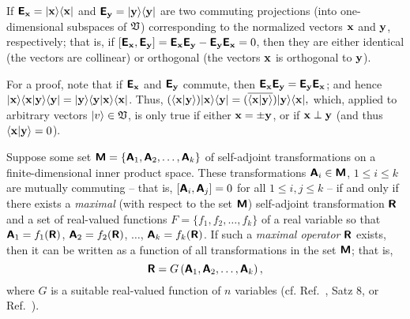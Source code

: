 If
$\textsf{\textbf{E}}_{\bf x} = \vert {\bf x} \rangle \langle {\bf x} \vert$
and
$\textsf{\textbf{E}}_{\bf y} = \vert {\bf y} \rangle \langle {\bf y} \vert$
are two commuting projections (into one-dimensional subspaces of ${\frak V}$)
corresponding to the normalized vectors ${\bf x}$  and ${\bf y}$,
respectively; that is, if
$\left[
\textsf{\textbf{E}}_{\bf x}
,
\textsf{\textbf{E}}_{\bf y}
\right]=
\textsf{\textbf{E}}_{\bf x}
\textsf{\textbf{E}}_{\bf y}
-
\textsf{\textbf{E}}_{\bf y}
\textsf{\textbf{E}}_{\bf x}
=0$,
then they are either identical (the vectors are collinear) or orthogonal (the vectors ${\bf x}$ is orthogonal to ${\bf y}$).


{%
For a proof,
note that if $\textsf{\textbf{E}}_{\bf x}$ and $\textsf{\textbf{E}}_{\bf y}$ commute, then
$\textsf{\textbf{E}}_{\bf x}\textsf{\textbf{E}}_{\bf y} =  \textsf{\textbf{E}}_{\bf y}    \textsf{\textbf{E}}_{\bf x}$; and
hence $
\vert {\bf x} \rangle \langle {\bf x} \vert {\bf y} \rangle \langle {\bf y} \vert
=
\vert {\bf y} \rangle \langle {\bf y} \vert {\bf x} \rangle \langle {\bf x} \vert $. Thus,
$
(
\langle {\bf x} \vert {\bf y} \rangle )\vert {\bf x} \rangle  \langle {\bf y}  \vert
=
(\overline{\langle {\bf x} \vert {\bf y} \rangle})
\vert {\bf y} \rangle  \langle {\bf x} \vert  ,
$
which, applied to arbitrary vectors $ \vert   v\rangle \in {\frak V}$, is only true if either ${\bf x} = \pm {\bf y}$,
or if ${\bf x} \perp {\bf y}$ (and thus $\langle {\bf x} \vert {\bf y} \rangle =0$).
}



Suppose some set $\textsf{\textbf{M}}
=
\{
\textsf{\textbf{A}}_1,
\textsf{\textbf{A}}_2,
\ldots ,
\textsf{\textbf{A}}_k
\}
$
of  self-adjoint transformations on a finite-dimensional inner product space.
These  transformations  $\textsf{\textbf{A}}_i \in \textsf{\textbf{M}}$, $1\le i \le k$
are mutually commuting -- that is, $[\textsf{\textbf{A}}_i,\textsf{\textbf{A}}_j] =0$ for all $1\le i,j \le k$ -- if and only if there exists
a {\em maximal} (with respect to the set $\textsf{\textbf{M}}$) self-adjoint transformation  $\textsf{\textbf{R}}$ and
a set of real-valued functions
$F
=
\{
f_1,
f_2,
\ldots ,
f_k
\}
$ of a real variable so that
$
\textsf{\textbf{A}}_1=f_1 (\textsf{\textbf{R}})
$,
$
\textsf{\textbf{A}}_2=f_2 (\textsf{\textbf{R}})
$,
$\ldots $,
$\textsf{\textbf{A}}_k=f_k (\textsf{\textbf{R}})$.
If such a {\em maximal operator} $\textsf{\textbf{R}}$ exists, then
it can be written as a function of all transformations in the set $\textsf{\textbf{M}}$; that is,
\begin{equation}
\textsf{\textbf{R}}
=
G \left( \textsf{\textbf{A}}_1,
\textsf{\textbf{A}}_2,
\ldots ,
\textsf{\textbf{A}}_k
\right),
\label{2016-pu-book-chapter-qm-fdvst-mo}
\end{equation}
where $G$ is a suitable real-valued function of $n$ variables
(cf. Ref.~\cite{v-neumann-31}, Satz 8, or Ref.~\cite[\S~84]{halmos-vs}).

